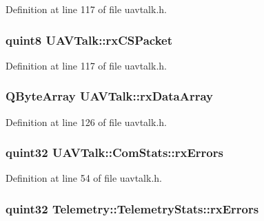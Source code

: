 Definition at line 117 of file uavtalk.\-h.

\hypertarget{group___u_a_v_talk_plugin_gab6dc6fd77ce7d02c121d7c197dfdebd2}{
\subsubsection[{rx\-C\-S\-Packet}]{\setlength{\rightskip}{0pt plus 5cm}quint8 U\-A\-V\-Talk\-::rx\-C\-S\-Packet\hspace{0.3cm}{\ttfamily [protected]}}}\label{group___u_a_v_talk_plugin_gab6dc6fd77ce7d02c121d7c197dfdebd2}


Definition at line 117 of file uavtalk.\-h.

\hypertarget{group___u_a_v_talk_plugin_ga053813b68171430545f1bc1d69d450a0}{
\subsubsection[{rx\-Data\-Array}]{\setlength{\rightskip}{0pt plus 5cm}Q\-Byte\-Array U\-A\-V\-Talk\-::rx\-Data\-Array\hspace{0.3cm}{\ttfamily [protected]}}}\label{group___u_a_v_talk_plugin_ga053813b68171430545f1bc1d69d450a0}


Definition at line 126 of file uavtalk.\-h.

\hypertarget{group___u_a_v_talk_plugin_ga52c1d5163810f507e6ca052884ee7ecc}{
\subsubsection[{rx\-Errors}]{\setlength{\rightskip}{0pt plus 5cm}quint32 U\-A\-V\-Talk\-::\-Com\-Stats\-::rx\-Errors}}\label{group___u_a_v_talk_plugin_ga52c1d5163810f507e6ca052884ee7ecc}


Definition at line 54 of file uavtalk.\-h.

\hypertarget{group___u_a_v_talk_plugin_gaf07e5e11a7f3b4c277a26fa5dba7d3fa}{
\subsubsection[{rx\-Errors}]{\setlength{\rightskip}{0pt plus 5cm}quint32 Telemetry\-::\-Telemetry\-Stats\-::rx\-Errors}}\label{group___u_a_v_talk_plugin_gaf07e5e11a7f3b4c277a26fa5dba7d3fa}


